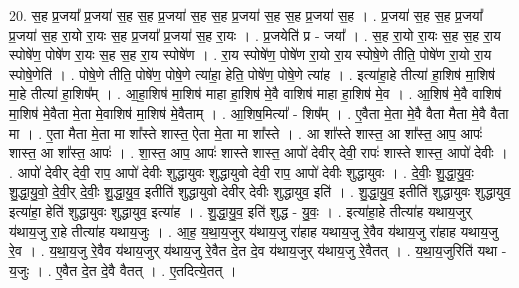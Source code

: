 \documentclass[17pt]{extarticle}
\begin{document}
20. स॒ह प्र॒जया᳚ प्र॒जया॑ स॒ह स॒ह प्र॒जया॑ स॒ह स॒ह प्र॒जया॑ स॒ह स॒ह प्र॒जया॑ स॒ह । . प्र॒जया॑ स॒ह स॒ह प्र॒जया᳚ प्र॒जया॑ स॒ह रा॒यो रा॒यः स॒ह प्र॒जया᳚ प्र॒जया॑ स॒ह रा॒यः । . प्र॒जयेति॑ प्र - जया᳚ । . स॒ह रा॒यो रा॒यः स॒ह स॒ह रा॒य स्पोषे॑ण॒ पोषे॑ण रा॒यः स॒ह स॒ह रा॒य स्पोषे॑ण । . रा॒य स्पोषे॑ण॒ पोषे॑ण रा॒यो रा॒य स्पोषे॒णे तीति॒ पोषे॑ण रा॒यो रा॒य स्पोषे॒णेति॑ । . पोषे॒णे तीति॒ पोषे॑ण॒ पोषे॒णे त्या॑हा॒ हेति॒ पोषे॑ण॒ पोषे॒णे त्या॑ह । . इत्या॑हा॒हे तीत्या॑ हा॒शिष॑ मा॒शिष॑ मा॒हे तीत्या॑ हा॒शिष᳚म् । . आ॒हा॒शिष॑ मा॒शिष॑ माहा हा॒शिष॑ मे॒वै वाशिष॑ माहा हा॒शिष॑ मे॒व । . आ॒शिष॑ मे॒वै वाशिष॑ मा॒शिष॑ मे॒वैता मे॒ता मे॒वाशिष॑ मा॒शिष॑ मे॒वैताम् । . आ॒शिष॒मित्या᳚ - शिष᳚म् । . ए॒वैता मे॒ता मे॒वै वैता मैता मे॒वै वैता मा । . ए॒ता मैता मे॒ता मा शा᳚स्ते शास्त॒ ऐता मे॒ता मा शा᳚स्ते । . आ शा᳚स्ते शास्त॒ आ शा᳚स्त॒ आप॒ आपः॑ शास्त॒ आ शा᳚स्त॒ आपः॑ । . शा॒स्त॒ आप॒ आपः॑ शास्ते शास्त॒ आपो॑ देवीर् देवी॒ रापः॑ शास्ते शास्त॒ आपो॑ देवीः । . आपो॑ देवीर् देवी॒ राप॒ आपो॑ देवीः शुद्धायुवः शुद्धायुवो देवी॒ राप॒ आपो॑ देवीः शुद्धायुवः । . दे॒वीः॒ शु॒द्धा॒यु॒वः॒ शु॒द्धा॒यु॒वो॒ दे॒वी॒र् दे॒वीः॒ शु॒द्धा॒यु॒व॒ इतीति॑ शुद्धायुवो देवीर् देवीः शुद्धायुव॒ इति॑ । . शु॒द्धा॒यु॒व॒ इतीति॑ शुद्धायुवः शुद्धायुव॒ इत्या॑हा॒ हेति॑ शुद्धायुवः शुद्धायुव॒ इत्या॑ह । . शु॒द्धा॒यु॒व॒ इति॑ शुद्ध - यु॒वः॒ । . इत्या॑हा॒हे तीत्या॑ह यथाय॒जुर् य॑थाय॒जु रा॒हे तीत्या॑ह यथाय॒जुः । . आ॒ह॒ य॒था॒य॒जुर् य॑थाय॒जु रा॑हाह यथाय॒जु रे॒वैव य॑थाय॒जु रा॑हाह यथाय॒जु रे॒व । . य॒था॒य॒जु रे॒वैव य॑थाय॒जुर् य॑थाय॒जु रे॒वैत दे॒त दे॒व य॑थाय॒जुर् य॑थाय॒जु रे॒वैतत् । . य॒था॒य॒जुरिति॑ यथा - य॒जुः । . ए॒वैत दे॒त दे॒वै वैतत् । . ए॒तदित्ये॒तत् । \newline
\pagebreak
{}
\end{document}

